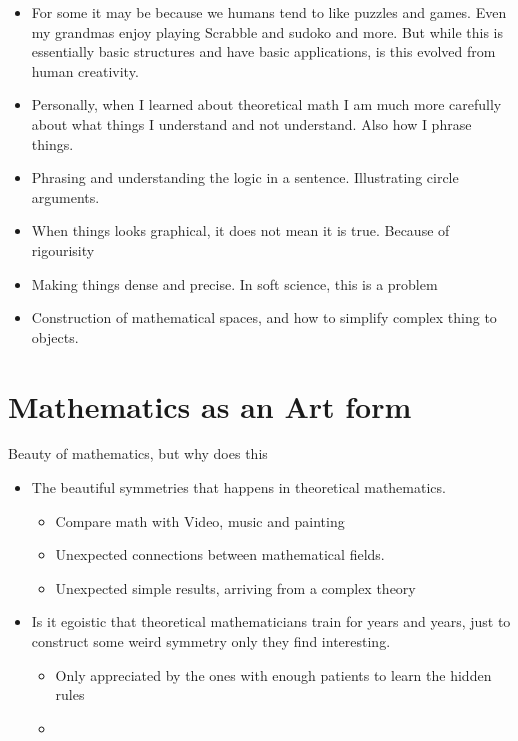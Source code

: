 \documentclass[10pt,conference]{IEEEtran}
\begin{document}
\begin{sloppy}
\begin{itemize}
    \item For some it may be because we humans tend to like puzzles and games. Even my grandmas enjoy playing Scrabble and sudoko and more. But while this is essentially basic structures and have basic applications, is this evolved from human creativity.
    \item Personally, when I learned about theoretical math I am much more carefully about what things I understand and not understand. Also how I phrase things.
    \item Phrasing and understanding the logic in a sentence. Illustrating circle arguments.
    \item When things looks graphical, it does not mean it is true. Because of rigourisity
    \item Making things dense and precise. In soft science, this is a problem
    \item Construction of mathematical spaces, and how to simplify complex thing to objects.
\end{itemize}


\newpage
\section{Mathematics as an Art form}%
\label{sec:mathematics_for_stimulating_intellectual_mind}

Beauty of mathematics, but why does this
\begin{itemize}
    \item The beautiful symmetries that happens in theoretical mathematics.
        \begin{itemize}
            \item Compare math with Video, music and painting
            \item Unexpected connections between mathematical fields.
            \item Unexpected simple results, arriving from a complex theory
        \end{itemize}
    \item Is it egoistic that theoretical mathematicians train for years and years, just to construct some weird symmetry only they find interesting.
        \begin{itemize}
            \item Only appreciated by the ones with enough patients to learn the hidden rules
            \item
        \end{itemize}
\end{itemize}

\newpage






    \printbibliography
\end{sloppy}
\end{document}

